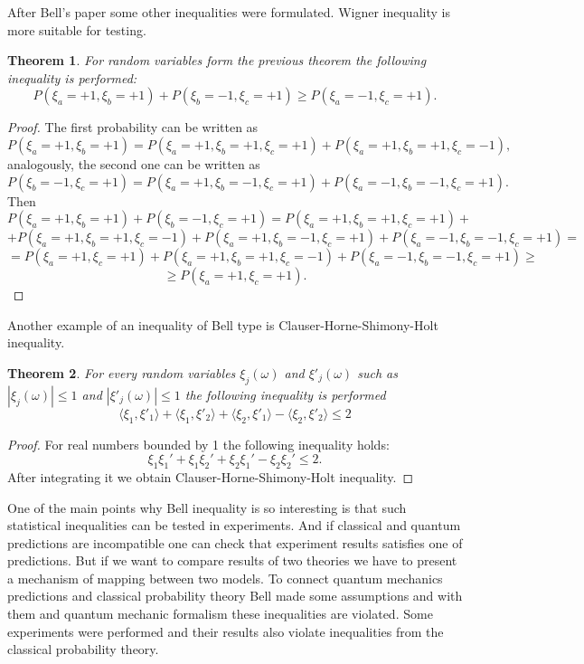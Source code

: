 \documentclass[11pt]{article}
\newtheorem{theorem}{Theorem}[section]
\begin{document}
After Bell's paper some other inequalities were formulated. Wigner inequality is more suitable for testing.
\begin{theorem}
For random variables form the previous theorem the following inequality is performed:
\[
P(\xi_a = +1, \xi_b = +1) + P(\xi_b = -1, \xi_c = +1) \geq P(\xi_a = -1, \xi_c = +1).
\]
\end{theorem}

\begin{proof}
The first probability can be written as 
\[
P(\xi_a = +1, \xi_b = +1) = P(\xi_a = +1, \xi_b = +1, \xi_c = +1) + P(\xi_a = +1, \xi_b = +1, \xi_c = -1),
\]
analogously, the second one can be written as
\[
P(\xi_b = -1, \xi_c = +1) = P(\xi_a = +1, \xi_b = -1, \xi_c = +1) + P(\xi_a = -1, \xi_b = -1, \xi_c = +1).
\]
Then
\[
P(\xi_a = +1, \xi_b = +1) + P(\xi_b = -1, \xi_c = +1) = P(\xi_a = +1, \xi_b = +1, \xi_c = +1) + 
\] 
\[
 + P(\xi_a = +1, \xi_b = +1, \xi_c = -1) + P(\xi_a = +1, \xi_b = -1, \xi_c = +1) + P(\xi_a = -1, \xi_b = -1, \xi_c = +1) = 
\]
\[
 =  P(\xi_a = +1, \xi_c = +1) + P(\xi_a = +1, \xi_b = +1, \xi_c = -1) + P(\xi_a = -1, \xi_b = -1, \xi_c = +1)\geq
\]
\[
 \geq P(\xi_a = +1, \xi_c = +1).
\]
\end{proof}

Another example of an inequality of Bell type is Clauser-Horne-Shimony-Holt inequality.
\begin{theorem}
For every random variables $\xi_j(\omega)$ and $\xi'_j(\omega)$ such as $|\xi_j(\omega)| \leq 1$ and $|\xi'_j(\omega)| \leq 1$ the following inequality is performed
\[
\langle\xi_1,\xi'_1\rangle + \langle\xi_1,\xi'_2\rangle + \langle\xi_2,\xi'_1\rangle -  \langle\xi_2,\xi'_2\rangle \leq 2
\]
\end{theorem}

\begin{proof}
For real numbers bounded by 1 the following inequality holds:
\[
\xi_1\xi_1' + \xi_1\xi_2' + \xi_2\xi_1' - \xi_2\xi_2' \leq 2.
\]
After integrating it we obtain Clauser-Horne-Shimony-Holt inequality.

\end{proof}

One of the main points why Bell inequality is so interesting is that such statistical inequalities can be tested in experiments. And if classical and quantum predictions are incompatible one can check that experiment results satisfies one of predictions. But if we want to compare results of two theories we have to present a mechanism of mapping between two models. To connect quantum mechanics predictions and classical probability theory Bell made some assumptions and with them and quantum mechanic formalism these inequalities are violated. Some experiments were performed and their results also violate inequalities from the classical probability theory. 
\end{document}
